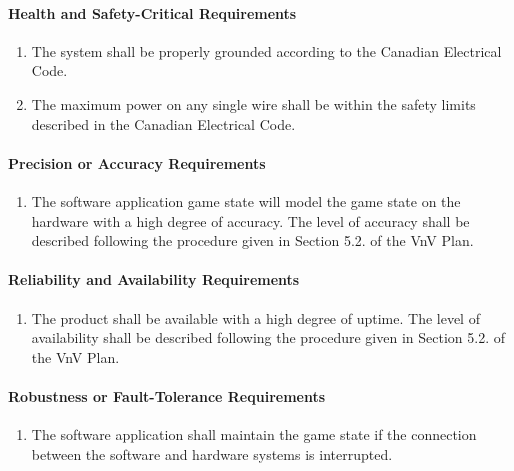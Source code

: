 \documentclass[12pt]{article}
\begin{document}
{\paragraph{Health and Safety-Critical Requirements}
\begin{enumerate}[{PR}1., leftmargin=2\parindent, resume]
    \item The system shall be properly grounded according to the Canadian Electrical Code. \cite{CanadianElectricalCode2021}
    \item The maximum power on any single wire shall be within the safety limits described in the Canadian Electrical Code.
\end{enumerate}

\paragraph{Precision or Accuracy Requirements}
\begin{enumerate}[{PR}1., leftmargin=2\parindent, resume]
    \item The software application game state will model the game state on the \progname{} hardware with a high degree of accuracy. 
    The level of accuracy shall be described following the procedure given in Section 5.2.\thevnvSectionNfr{}
    of the VnV Plan.
        
\end{enumerate}

\paragraph{Reliability and Availability Requirements}
\begin{enumerate}[{PR}1., leftmargin=2\parindent, resume]
    \item The product shall be available with a high degree of uptime. The level of availability shall be described following the procedure 
    given in Section 5.2.\thevnvSectionNfr{} of the VnV Plan.
\end{enumerate}

\paragraph{Robustness or Fault-Tolerance Requirements}
\begin{enumerate}[{PR}1., leftmargin=2\parindent, resume]
    \item The software application shall maintain the game state if the connection between the software and hardware systems is interrupted.
\end{enumerate}

}
\end{document}
